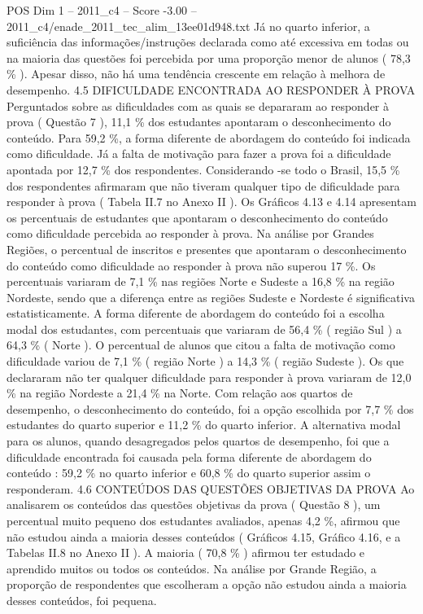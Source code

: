\begin{textsample}{POS Dim 1 – 2011\_c4 – Score -3.00 – 2011\_c4/enade\_2011\_tec\_alim\_13ee01d948.txt}
Já no quarto inferior, a suficiência das informações/instruções declarada como até excessiva em todas ou na maioria das questões foi percebida por uma proporção menor de alunos ( 78,3 \% ).
Apesar disso, não há uma tendência crescente em relação à melhora de desempenho. 4.5 DIFICULDADE ENCONTRADA AO RESPONDER À PROVA Perguntados sobre as dificuldades com as quais se depararam ao responder à prova ( Questão 7 ), 11,1 \% dos estudantes apontaram o desconhecimento do conteúdo.
Para 59,2 \%, a forma diferente de abordagem do conteúdo foi indicada como dificuldade.
Já a falta de motivação para fazer a prova foi a dificuldade apontada por 12,7 \% dos respondentes.
Considerando -se todo o Brasil, 15,5 \% dos respondentes afirmaram que não tiveram qualquer tipo de dificuldade para responder à prova ( Tabela II.7 no Anexo II ).
Os Gráficos 4.13 e 4.14 apresentam os percentuais de estudantes que apontaram o desconhecimento do conteúdo como dificuldade percebida ao responder à prova.
Na análise por Grandes Regiões, o percentual de inscritos e presentes que apontaram o desconhecimento do conteúdo como dificuldade ao responder à prova não superou 17 \%.
Os percentuais variaram de 7,1 \% nas regiões Norte e Sudeste a 16,8 \% na região Nordeste, sendo que a diferença entre as regiões Sudeste e Nordeste é significativa estatisticamente.
A forma diferente de abordagem do conteúdo foi a escolha modal dos estudantes, com percentuais que variaram de 56,4 \% ( região Sul ) a 64,3 \% ( Norte ).
O percentual de alunos que citou a falta de motivação como dificuldade variou de 7,1 \% ( região Norte ) a 14,3 \% ( região Sudeste ).
Os que declararam não ter qualquer dificuldade para responder à prova variaram de 12,0 \% na região Nordeste a 21,4 \% na Norte.
Com relação aos quartos de desempenho, o desconhecimento do conteúdo, foi a opção escolhida por 7,7 \% dos estudantes do quarto superior e 11,2 \% do quarto inferior.
A alternativa modal para os alunos, quando desagregados pelos quartos de desempenho, foi que a dificuldade encontrada foi causada pela forma diferente de abordagem do conteúdo : 59,2 \% no quarto inferior e 60,8 \% do quarto superior assim o responderam. 4.6 CONTEÚDOS DAS QUESTÕES OBJETIVAS DA PROVA Ao analisarem os conteúdos das questões objetivas da prova ( Questão 8 ), um percentual muito pequeno dos estudantes avaliados, apenas 4,2 \%, afirmou que não estudou ainda a maioria desses conteúdos ( Gráficos 4.15, Gráfico 4.16, e a Tabelas II.8 no Anexo II ).
A maioria ( 70,8 \% ) afirmou ter estudado e aprendido muitos ou todos os conteúdos.
Na análise por Grande Região, a proporção de respondentes que escolheram a opção não estudou ainda a maioria desses conteúdos, foi pequena.

\end{textsample}
